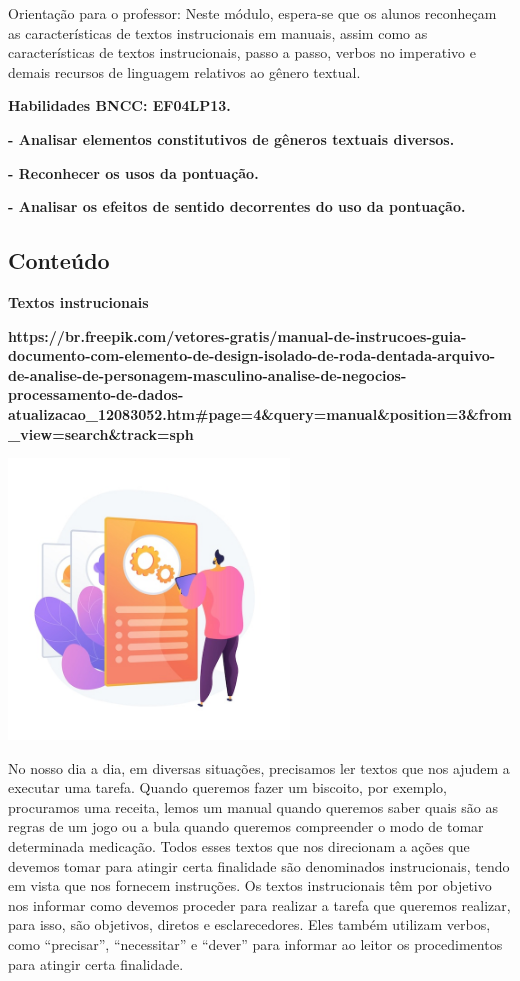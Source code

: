 \begin{itemize}
{{{Orientação para o professor: Neste módulo, espera-se que os alunos
reconheçam as características de textos instrucionais em manuais, assim
como as características de textos instrucionais, passo a passo, verbos
no imperativo e demais recursos de linguagem relativos ao gênero
textual.

\textbf{Habilidades BNCC: EF04LP13.}


\begin{itemize}
\textbf{- Analisar elementos constitutivos de gêneros textuais
diversos.}

\textbf{- Reconhecer os usos da pontuação.}

\textbf{- Analisar os efeitos de sentido decorrentes do uso da
pontuação.}

\subsection{Conteúdo}\label{conteuxfado-2}

\textbf{Textos instrucionais }

\textbf{https://br.freepik.com/vetores-gratis/manual-de-instrucoes-guia-documento-com-elemento-de-design-isolado-de-roda-dentada-arquivo-de-analise-de-personagem-masculino-analise-de-negocios-processamento-de-dados-atualizacao\_12083052.htm\#page=4\&query=manual\&position=3\&from\_view=search\&track=sph}

\includegraphics[width=2.93750in,height=2.93750in]{media/image9.jpeg}

No nosso dia a dia, em diversas situações, precisamos ler textos que nos
ajudem a executar uma tarefa. Quando queremos fazer um biscoito, por
exemplo, procuramos uma receita, lemos um manual quando queremos saber
quais são as regras de um jogo ou a bula quando queremos compreender o
modo de tomar determinada medicação. Todos esses textos que nos
direcionam a ações que devemos tomar para atingir certa finalidade são
denominados instrucionais, tendo em vista que nos fornecem instruções.
Os textos instrucionais têm por objetivo nos informar como devemos
proceder para realizar a tarefa que queremos realizar, para isso, são
objetivos, diretos e esclarecedores. Eles também utilizam verbos, como
``precisar'', ``necessitar'' e ``dever'' para informar ao leitor os
procedimentos para atingir certa finalidade.


\end{itemize}}}}
\end{itemize}
